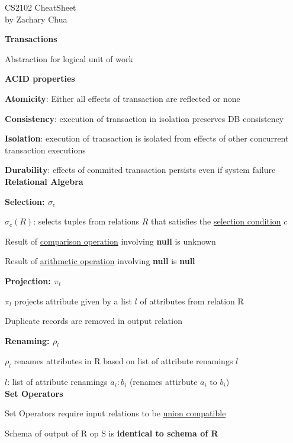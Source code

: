\documentclass[10pt, a4paper]{article}
\author{Zachary Chua Yan Ern}
\date{March 2022}
\newcommand{\highlight}[1]{{\color{red}\textbf{#1}}}
\newcommand{\red}[1]{{\color{red}#1}}
\newcommand{\header}[1]{{\normalsize\textbf{#1}}}
\begin{document}
	\scriptsize %
	\setlength\parindent{0pt}
	\setlength{\columnseprule}{0.1pt}
	
	\begin{center}
		{\large CS2102 CheatSheet}\\
		by Zachary Chua
	\end{center}

	\begin{multicols*}{3}
		\textbf{Transactions}

		Abstraction for logical unit of work

		\highlight{ACID properties}

		\textbf{Atomicity}: Either all effects of transaction are reflected or none
		
		\textbf{Consistency}: execution of transaction in isolation preserves DB consistency

		\textbf{Isolation}: execution of transaction is isolated from effects of other concurrent transaction executions

		\textbf{Durability}: effects of commited transaction persists even if system failure\\

		\header{Relational Algebra}

		\textbf{Selection: $\sigma _c$}

		$\sigma _c(R)$: selects tuples from relations $R$ that satisfies the \underline{selection condition} $c$

		Result of \underline{comparison operation} involving \highlight{null} is \red{unknown}

		Result of \underline{arithmetic operation} involving \highlight{null} is \highlight{null}

		\textbf{Projection: $\pi _l$}

		$\pi _l$ projects attribute given by a list $l$ of attributes from relation R

		Duplicate records are removed in output relation

		\textbf{Renaming: $\rho _l$}

		$\rho _l$ renames attributes in R based on list of attribute renamings $l$

		$l$: list of attribute renamings $a_i:b_i$ (renames attirbute $a_i$ to $b_i$)\\

		\textbf{Set Operators}

		Set Operators require input relations to be \underline{union compatible}

		Schema of output of R op S is \highlight{identical to schema of R}


\end{multicols*}
\end{document}
